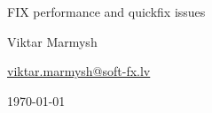 \begin{titlepage}


\begin{center}
\LARGE

\vspace*{\fill}
\vspace*{\fill}

FIX performance and quickfix issues

\vspace*{\fill}

Viktar Marmysh


\href{mailto:viktar.marmysh@soft-fx.lv}{viktar.marmysh@soft-fx.lv}

\vspace*{\fill}
\today
\end{center}







\end{titlepage}

